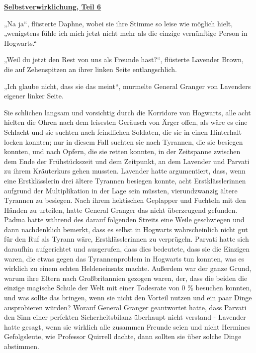 

\hypertarget{selbstverwirklichung-teil-6}{%

\textbf{\uline{Selbstverwirklichung, Teil 6}}

„Na ja“, flüsterte Daphne, wobei sie ihre Stimme so leise wie möglich hielt, „wenigstens fühle ich mich jetzt nicht mehr als die einzige vernünftige Person in Hogwarts.“

„Weil du jetzt den Rest von uns als Freunde hast?“, flüsterte Lavender Brown, die auf Zehenspitzen an ihrer linken Seite entlangschlich.

„Ich glaube nicht, dass sie das meint“, murmelte General Granger von Lavenders eigener linker Seite.

Sie schlichen langsam und vorsichtig durch die Korridore von Hogwarts, alle acht hielten die Ohren nach dem leisesten Geräusch von Ärger offen, als wäre es eine Schlacht und sie suchten nach feindlichen Soldaten, die sie in einen Hinterhalt locken konnten; nur in diesem Fall suchten sie nach Tyrannen, die sie besiegen konnten, und nach Opfern, die sie retten konnten, in der Zeitspanne zwischen dem Ende der Frühstückszeit und dem Zeitpunkt, an dem Lavender und Parvati zu ihrem Kräuterkurs gehen mussten. Lavender hatte argumentiert, dass, wenn eine Erstklässlerin drei ältere Tyrannen besiegen konnte, acht Erstklässlerinnen aufgrund der Multiplikation in der Lage sein müssten, vierundzwanzig ältere Tyrannen zu besiegen. Nach ihrem hektischen Geplapper und Fuchteln mit den Händen zu urteilen, hatte General Granger das nicht überzeugend gefunden. Padma hatte während des darauf folgenden Streits eine Weile geschwiegen und dann nachdenklich bemerkt, dass es selbst in Hogwarts wahrscheinlich nicht gut für den Ruf als Tyrann wäre, Erstklässlerinnen zu verprügeln. Parvati hatte sich daraufhin aufgerichtet und ausgerufen, dass dies bedeutete, dass sie die Einzigen waren, die etwas gegen das Tyrannenproblem in Hogwarts tun konnten, was es wirklich zu einem echten Heldeneinsatz machte. Außerdem war der ganze Grund, warum ihre Eltern nach Großbritannien gezogen waren, der, dass die beiden die einzige magische Schule der Welt mit einer Todesrate von 0 \% besuchen konnten, und was sollte das bringen, wenn sie nicht den Vorteil nutzen und ein paar Dinge ausprobieren würden? Worauf General Granger geantwortet hatte, dass Parvati den Sinn einer perfekten Sicherheitsbilanz überhaupt nicht verstand - Lavender hatte gesagt, wenn sie wirklich alle zusammen Freunde seien und nicht Hermines Gefolgsleute, wie Professor Quirrell dachte, dann sollten sie über solche Dinge abstimmen.

}
